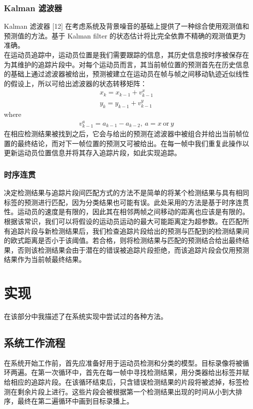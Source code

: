 \documentclass{article}
\begin{document}
\subsubsection{Kalman 滤波器}
Kalman 滤波器 [12] 在考虑系统及背景噪音的基础上提供了一种综合使用观测值和预测值的方法。基于 Kalman filter 的状态估计将比完全依靠不精确的观测值更为准确。\\
在运动员追踪中，运动员位置是我们需要跟踪的信息，其历史信息按时序被保存在为其维护的追踪片段中。对每个运动员而言，其当前帧位置的预测首先在历史信息的基础上通过滤波器被给出，预测被建立在运动员在帧与帧之间移动轨迹近似线性的假设上，所以可给出滤波器的状态转移矩阵：\\
\begin{align*}
x_k = x_{k-1}+v_{k-1}^x \\
y_k = y_{k-1}+v_{k-1}^y
\end{align*}
where 
\begin{align*}
v_{k-1}^a = a_{k-1} - a_{k-2}, \: a=x \: \text{or} \:y
\end{align*}
在相应检测结果被找到之后，它会与给出的预测在滤波器中被组合并给出当前帧位置的最终结论，而对下一帧位置的预测又可被给出。在每一帧中我们重复此操作以更新运动员位置信息并将其存入追踪片段，如此实现追踪。
\subsubsection{时序连贯}
决定检测结果与追踪片段间匹配方式的方法不是简单的将某个检测结果与具有相同标签的预测进行匹配，因为分类结果也可能有误。此处采用的方法是基于时序连贯性。运动员的速度是有限的，因此其在相邻两帧之间移动的距离也应该是有限的。\\
根据该常识，我们可以将假设的运动员运动的最大可能距离定为超参数。在匹配所有追踪片段与新检测结果后，我们检查追踪片段给出的预测与匹配到的检测结果间的欧式距离是否小于该阈值。若合格，则将检测结果与匹配的预测结合给出最终结果，否则该检测结果会由于潜在的错误被追踪片段拒绝，而该追踪片段会仅用预测结果作为当前帧最终结果。
\newpage
\section{实现}
在该部分中我描述了在系统实现中尝试过的各种方法。
\subsection{系统工作流程}
在系统开始工作前，首先应准备好用于运动员检测和分类的模型。目标录像将被循环两遍。在第一次循环中，首先在每一帧中寻找检测结果，用分类器给出标签并赋给相应的追踪片段。在该循环结束后，只含错误检测结果的片段将被滤掉，标签检测在剩余片段上进行。这些片段会被根据第一个检测结果出现的时间从小到大排序，最终在第二遍循环中画到目标录播上。
\end{document}
